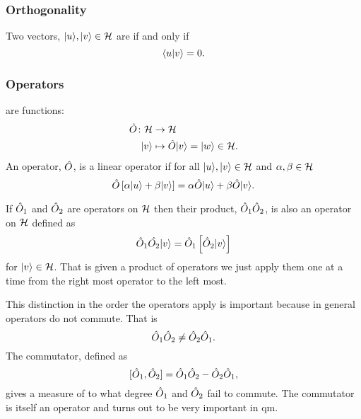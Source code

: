     \subsubsection{Orthogonality}
    Two vectors, \(\vert {u} \rangle, \vert {v} \rangle\in\mathcal{H}\) are  if and only if
    \[\langle {u} \vert {v} \rangle = 0.\]
    
    \subsubsection{Operators}
     are functions:
    \begin{align*}
        \hat{O}\colon\mathcal{H} &\to \mathcal{H}\\
        \vert {v} \rangle &\mapsto \hat{O}\vert {v} \rangle = \vert {w} \rangle\in\mathcal{H}.
    \end{align*}
    An operator, \(\hat{O}\), is a linear operator if for all \(\vert {u} \rangle, \vert {v} \rangle\in\mathcal{H}\) and \(\alpha, \beta\in\mathcal{H}\)
    \[\hat{O}\left[\alpha\vert {u} \rangle + \beta\vert {v} \rangle\right] = \alpha\hat{O}\vert {u} \rangle + \beta\hat{O}\vert {v} \rangle.\]
    
    If \(\hat{O}_1\) and \(\hat{O}_2\) are operators on \(\mathcal{H}\) then their product, \(\hat{O}_1\hat{O}_2\), is also an operator on \(\mathcal{H}\) defined as
    \[\hat{O}_1\hat{O_2}\vert {v} \rangle = \hat{O}_1\left[\hat{O}_2\vert {v} \rangle\right]\]
    for \(\vert {v} \rangle\in\mathcal{H}\).
    That is given a product of operators we just apply them one at a time from the right most operator to the left most.
    
    This distinction in the order the operators apply is important because in general operators do not commute.
    That is
    \[\hat{O}_1\hat{O}_2 \ne \hat{O}_2\hat{O}_1.\]
    The commutator, defined as
    \[[\hat{O}_1, \hat{O}_2] = \hat{O}_1\hat{O}_2 - \hat{O}_2\hat{O}_1,\]
    gives a measure of to what degree \(\hat{O}_1\) and \(\hat{O}_2\) fail to commute.
    The commutator is itself an operator and turns out to be very important in \acrshort{qm}.
    
